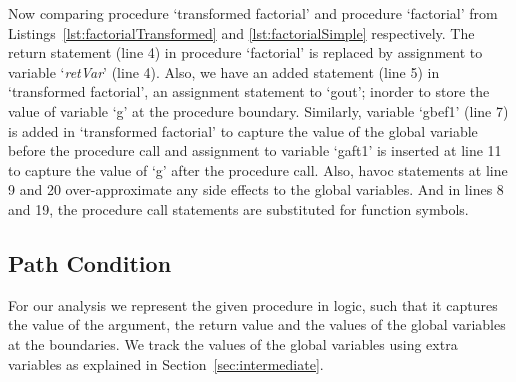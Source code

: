 \documentclass{llncs}
\newcommand{\retVar}{\textit{retVar}}
\begin{document}

Now comparing procedure `transformed factorial' and procedure
`factorial' from Listings~\ref{lst:factorialTransformed} and
\ref{lst:factorialSimple} respectively. The return statement (line 4)
in procedure `factorial' is replaced by assignment to variable
`\retVar' (line 4). Also, we have an added statement (line 5) in
`transformed factorial', an assignment statement to `gout'; inorder to
store the value of variable `g' at the procedure boundary. Similarly,
variable `gbef1' (line 7) is added in `transformed factorial' to
capture the value of the global variable before the procedure call and
assignment to variable `gaft1' is inserted at line 11 to capture the
value of `g' after the procedure call. Also, havoc statements at line
9 and 20 over-approximate any side effects to the global
variables. And in lines 8 and 19, the procedure call statements are
substituted for function symbols.

\subsection{Path Condition}
For our analysis we represent the given procedure in logic, such that
it captures the value of the argument, the return value and the values
of the global variables at the boundaries. We track the values of the
global variables using extra variables as explained in
Section~\ref{sec:intermediate}.
\end{document}
